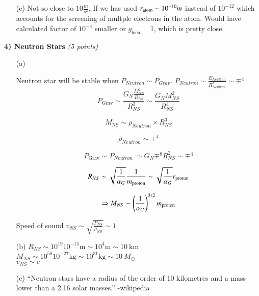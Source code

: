 {\begin{itemize}
{}
\item[(c)]{
Not so close to $10 \frac{m}{s^2}$, If we has used $r_{\textrm{atom}} \sim10^{-10} m$ instead of $10^{-12}$ which accounts for the screening of multple electrons in the atom. 
Would have calculated factor of $10^{-4}$ smaller or $g_\textrm{local}$ ~ 1, which is pretty close.
}

\end{itemize}

\vspace*{0.25in}

\textbf{4) Neutron Stars } \hfill \textit{(5 points)}
\begin{itemize}
\item[(a)]{
Neutron star will be stable when $P_{Neutron} \sim P_{Grav}$.
$P_{Neutron} \sim \frac{E_{Neutron}}{R_{Neutron}^3} \sim \mp^4$
\begin{equation*}
P_\textrm{Grav} \sim \frac{G_N \frac{M_{NS}^2}{R_{NS}}}{R_{NS}^3} \sim \frac{G_N M_{NS}^2}{R_{NS}^4}
\end{equation*}

\begin{equation*}
M_\textrm{NS} \sim \rho_{Neutron}\times R_{NS}^3
\end{equation*}

\begin{equation*}
\rho_{Neutron} \sim \mp^4
\end{equation*}


\begin{equation*}
P_\textrm{Grav} \sim P_{Neutron} \Rightarrow  G_N \mp^8 R_{NS}^2 \sim \mp^4
\end{equation*}

\begin{equation*}
R_{NS} \sim \sqrt{\frac{1}{\alpha_G}} \frac{1}{m_{\textrm{proton}}} \sim \sqrt{\frac{1}{\alpha_G}} r_{\textrm{proton}}
\end{equation*}

\begin{equation*}
\Rightarrow M_{NS} \sim \left(\frac{1}{\alpha_G}\right)^{3/2} m_{\textrm{proton}} 
\end{equation*}

Speed of sound $v_{NS} \sim \sqrt{\frac{P_{NS}}{\rho_{NS}}} \sim 1$

}


\item[(b)]{
$R_{NS} \sim 10^{19} 10^{-15} \text{m} \sim 10^4 \text{m} \sim 10\ \text{km} $  \\
$M_{NS} \sim 10^{58} 10^{-27} \text{kg} \sim 10^{31} \text{kg} \sim 10\ M_\odot $  \\
$v_{NS} \sim c$
}
\item[(c)]{
``Neutron stars have a radius of the order of 10 kilometres and a mass lower than a 2.16 solar masses.'' -wikipedia
}


\end{itemize}}
